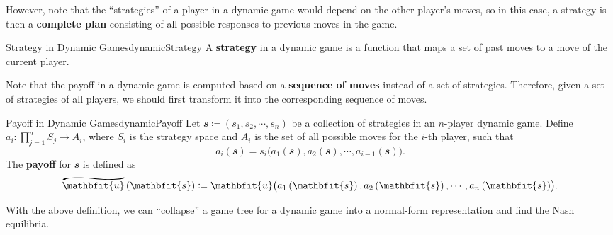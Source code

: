 \documentclass[math]{amznotes}
\renewcommand\widetilde[1]{\ThisStyle{%
  \setbox0=\hbox{$\SavedStyle#1$}%
  \stackengine{1pt-\LMpt}{$\SavedStyle#1$}{%
    \stretchto{\scaleto{\SavedStyle\mkern.2mu\sim}{.5467\wd0}}{.5\ht0}%
  }{O}{c}{F}{T}{S}%
}}
\theoremstyle{remark}
\begin{document}
However, note that the ``strategies'' of a player in a dynamic game would depend on the other player's moves, so in this case, a strategy is then a \textbf{complete plan} consisting of all possible responses to previous moves in the game.
\begin{dfnbox}{Strategy in Dynamic Games}{dynamicStrategy}
    A {\color{red} \textbf{strategy}} in a dynamic game is a function that maps a set of past moves to a move of the current player.
\end{dfnbox}
Note that the payoff in a dynamic game is computed based on a \textbf{sequence of moves} instead of a set of strategies. Therefore, given a set of strategies of all players, we should first transform it into the corresponding sequence of moves.
\begin{dfnbox}{Payoff in Dynamic Games}{dynamicPayoff}
    Let $\mathbfit{s} \coloneqq \left(s_1, s_2, \cdots, s_n\right)$ be a collection of strategies in an $n$-player dynamic game. Define $a_i \colon \prod_{j = 1}^nS_j \to A_i$, where $S_i$ is the strategy space and $A_i$ is the set of all possible moves for the $i$-th player, such that 
    \begin{equation*}
        a_i\left(\mathbfit{s}\right) = s_i\bigl(a_1\left(\mathbfit{s}\right), a_2\left(\mathbfit{s}\right), \cdots, a_{i - 1}\left(\mathbfit{s}\right)\bigr).
    \end{equation*}
    The {\color{red} \textbf{payoff}} for $\mathbfit{s}$ is defined as
    \begin{equation*}
        \widetilde{\mathbfit{u}}\left(\mathbfit{s}\right) \coloneqq \mathbfit{u}\bigl(a_1\left(\mathbfit{s}\right), a_2\left(\mathbfit{s}\right), \cdots, a_n\left(\mathbfit{s}\right)\bigr).
    \end{equation*}
\end{dfnbox}
With the above definition, we can ``collapse'' a game tree for a dynamic game into a normal-form representation and find the Nash equilibria. 
\end{document}
